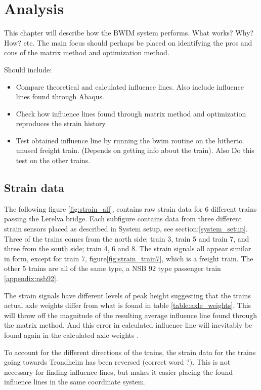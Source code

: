 \section{Analysis}

This chapter will describe how the BWIM system performs. What works? Why? How? etc.
The main focus should perhaps be placed on identifying the pros and cons of the matrix method and optimization method.

Should include:
\begin{itemize}
\item Compare theoretical and calculated influence lines. Also include influence lines found through Abaqus.
\item Check how influence lines found through matrix method and optimization reproduces the strain history
\item Test obtained influence line by running the bwim routine on the hitherto unused freight train. (Depends on getting info about the train). Also Do this test on the other trains.
\end{itemize}

\subsection{Strain data}
The following figure \ref{fig:strain_all}, contains raw strain data for 6 different trains passing the Lerelva bridge. Each subfigure contains data from three different strain sensors placed as described in System setup, see section:\ref{system_setup}. Three of the trains comes from the north side; train 3, train 5 and train 7, and three from the south side; train 4, 6 and 8. The strain signals all appear similar in form, except for train 7, figure\ref{fig:strain_train7}, which is a freight train. The other 5 trains are all of the same type, a NSB 92 type passenger train \ref{appendix:nsb92}.

The strain signals have different levels of peak height suggesting that the trains actual axle weights differ from what is found in table \ref{table:axle_weights}. This will throw off the magnitude of the resulting average influence line found through the matrix method. And this error in calculated influence line will inevitably be found again in the calculated axle weights \label{peaks_heights}.

To account for the different directions of the trains, the strain data for the trains going towards Trondheim has been reversed (correct word ?). This is not necessary for finding influence lines, but makes it easier placing the found influence lines in the same coordinate system.

